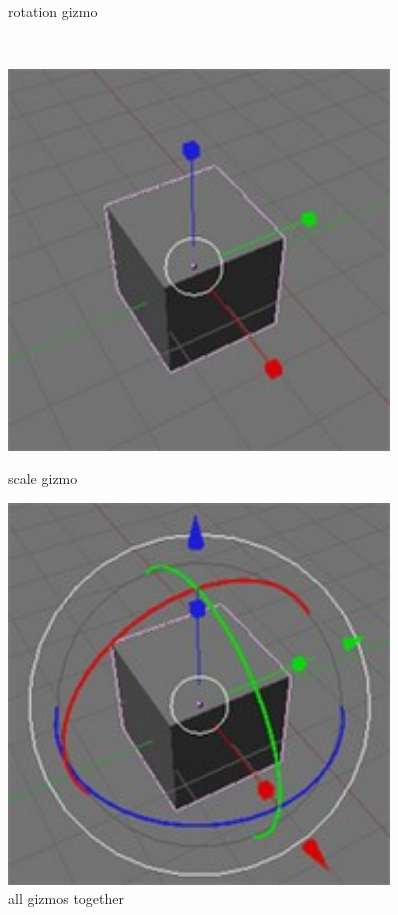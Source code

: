 \begin{figure}[htbp]
\begin{minipage}{.5\textwidth}
  	\caption{rotation gizmo \cite{blenderwiki}}
  \end{minipage}\\
  \begin{minipage}{.5\textwidth}
    \centering
    \includegraphics[width=0.9\textwidth]{../assets/Manual-Manipulators-Scale.jpg}
  	\caption{scale gizmo \cite{blenderwiki}}
  \end{minipage}
  \begin{minipage}{.5\textwidth}
    \centering
    \includegraphics[width=0.9\textwidth]{../assets/Manual-Manipulators-Combo.jpg}
  	\caption{all gizmos together \cite{blenderwiki}}
  \end{minipage}
\end{figure}
